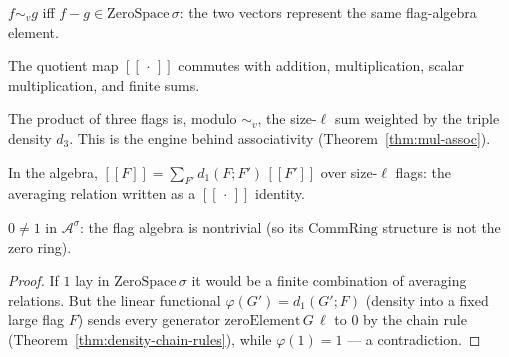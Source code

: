 \begin{definition}
  \label{def:flag-vector-eqv}
  \leanok
  $f \sim_v g$ iff $f - g \in \mathrm{ZeroSpace}\,\sigma$: the two vectors
  represent the same flag-algebra element.
\end{definition}

\begin{theorem}
  \label{thm:quot-hom}
  \leanok
  The quotient map $[\![\,\cdot\,]\!]$ commutes with addition, multiplication,
  scalar multiplication, and finite sums.
\end{theorem}

\begin{theorem}
  \label{thm:triple-mul-density}
  \leanok
  The product of three flags is, modulo $\sim_v$, the size-$\ell$ sum weighted by
  the triple density $d_3$. This is the engine behind associativity
  (Theorem~\ref{thm:mul-assoc}).
\end{theorem}

\begin{theorem}
  \label{thm:basis-quot-eq-sum}
  \leanok
  In the algebra, $[\![F]\!] = \sum_{F'} d_1(F;F')\,[\![F']\!]$ over size-$\ell$
  flags: the averaging relation written as a $[\![\,\cdot\,]\!]$ identity.
\end{theorem}

\begin{theorem}[Nontriviality]
  \label{thm:flag-algebra-nontrivial}
  \leanok
  $0 \ne 1$ in $\mathcal{A}^\sigma$: the flag algebra is nontrivial (so its
  $\mathrm{CommRing}$ structure is not the zero ring).
\end{theorem}
\begin{proof}\leanok
  If $1$ lay in $\mathrm{ZeroSpace}\,\sigma$ it would be a finite combination of
  averaging relations. But the linear functional $\varphi(G') = d_1(G';F)$
  (density into a fixed large flag $F$) sends every generator
  $\mathrm{zeroElement}\,G\,\ell$ to $0$ by the chain rule
  (Theorem~\ref{thm:density-chain-rules}), while $\varphi(1) = 1$ --- a
  contradiction.
\end{proof}


